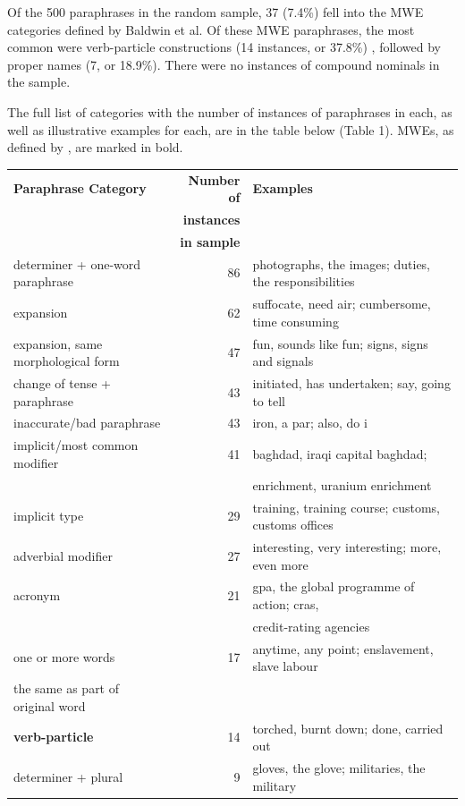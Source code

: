 \documentclass[11pt]{article}
\begin{document}
Of the 500 paraphrases in the random sample, 37 (7.4\%) fell into the MWE categories defined by Baldwin et al. Of these MWE paraphrases, the most common were verb-particle constructions (14 instances, or 37.8\%) , followed by proper names (7, or 18.9\%). There were no instances of compound nominals in the sample.

The full list of categories with the number of instances of paraphrases in each, as well as illustrative examples for each, are in the table below (Table 1). MWEs, as defined by , are marked in bold. 

\begin{table}[h]
\begin{center}
\begin{tabular}{|l|r|l|}
\hline \bf Paraphrase Category & \bf Number of & \bf Examples \\ 
 & \bf instances & \\
 & \bf in sample & \\ \hline
determiner + one-word paraphrase & 86 & photographs, the images; duties, the responsibilities \\
expansion & 62 & suffocate, need air; cumbersome, time consuming \\
expansion, same morphological form & 47 & fun, sounds like fun; signs, signs and signals \\
change of tense + paraphrase & 43 & initiated, has undertaken; say, going to tell \\
inaccurate/bad paraphrase & 43 & iron, a par; also, do i\\
implicit/most common modifier & 41 & baghdad, iraqi capital baghdad; \\
&& enrichment, uranium enrichment \\
implicit type & 29 & training, training course; customs, customs offices \\
adverbial modifier& 27 & interesting, very interesting; more, even more \\
acronym & 21 & gpa, the global programme of action; cras, \\
&& credit-rating agencies \\
one or more words  & 17 &  anytime, any point; enslavement, slave labour \\
the same as part of original word & &\\
\bf verb-particle & 14  & torched, burnt down; done, carried out\\
determiner + plural & 9 & gloves, the glove; militaries, the military\\

\end{tabular}
\end{center}
\end{table}
\end{document}
